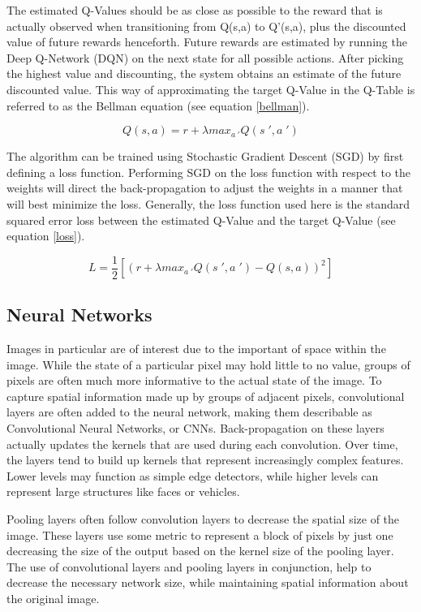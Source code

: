 \documentclass{article}
\begin{document}
The estimated Q-Values should be as close as possible to the reward that is actually observed when transitioning from Q(s,a) to Q'(s,a), plus the discounted value of future rewards henceforth. Future rewards are estimated by running the Deep Q-Network (DQN) on the next state for all possible actions. After picking the highest value and discounting, the system obtains an estimate of the future discounted value. This way of approximating the target Q-Value in the Q-Table is referred to as the Bellman equation (see equation \ref{bellman}).

\begin{equation}\label{bellman}
	Q(s,a) = r + \lambda max_{a\;'} Q(s\;', a\;')
\end{equation}


The algorithm can be trained using Stochastic Gradient Descent (SGD) by first defining a loss function. Performing SGD on the loss function with respect to the weights will direct the back-propagation to adjust the weights in a manner that will best minimize the loss. Generally, the loss function used here is the standard squared error loss between the estimated Q-Value and the target Q-Value (see equation \ref{loss}).

\begin{equation}\label{loss}
	L = \frac{1}{2}[(r + \lambda max_{a\;'}Q(s\;', a\;') - Q(s,a))^2]
\end{equation}

\subsection{Neural Networks}

Images in particular are of interest due to the important of space within the image. While the state of a particular pixel may hold little to no value, groups of pixels are often much more informative to the actual state of the image. To capture spatial information made up by groups of adjacent pixels, convolutional layers are often added to the neural network, making them describable as Convolutional Neural Networks, or CNNs. Back-propagation on these layers actually updates the kernels that are used during each convolution. Over time, the layers tend to build up kernels that represent increasingly complex features. Lower levels may function as simple edge detectors, while higher levels can represent large structures like faces or vehicles.

Pooling layers often follow convolution layers to decrease the spatial size of the image. These layers use some metric to represent a block of pixels by just one decreasing the size of the output based on the kernel size of the pooling layer. The use of convolutional layers and pooling layers in conjunction, help to decrease the necessary network size, while maintaining spatial information about the original image.
\end{document}
